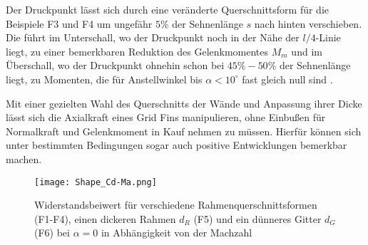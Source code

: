 Der Druckpunkt lässt sich durch eine veränderte Querschnittsform für die Beispiele F3 und F4 um ungefähr $5\%$ der Sehnenlänge $s$ nach hinten verschieben. Die führt im Unterschall, wo der Druckpunkt noch in der Nähe der $l/4$-Linie liegt, zu einer bemerkbaren Reduktion des Gelenkmomentes $M_m$ und im Überschall, wo der Druckpunkt ohnehin schon bei $45\%-50\%$ der Sehnenlänge liegt, zu Momenten, die für Anstellwinkel bis $\alpha<10^\circ$ fast gleich null sind \cite{Pattern}.

Mit einer gezielten Wahl des Querschnitts der Wände und Anpassung ihrer Dicke lässt sich die Axialkraft eines Grid Fins manipulieren, ohne Einbußen für Normalkraft und Gelenkmoment in Kauf nehmen zu müssen. Hierfür können sich unter bestimmten Bedingungen sogar auch positive Entwicklungen bemerkbar machen.
\begin{figure}[h]
	\centering
	\texttt{[image: Shape\_Cd-Ma.png]}
	\begin{flushright}
	\end{flushright}
	\caption{Widerstandsbeiwert für verschiedene Rahmenquerschnittsformen (F1-F4), einen dickeren Rahmen $d_R$ (F5) und ein dünneres Gitter $d_G$ (F6) bei $\alpha = 0$ in Abhängigkeit von der Machzahl}
	\label{abb_Shape_Cd}
\end{figure}

